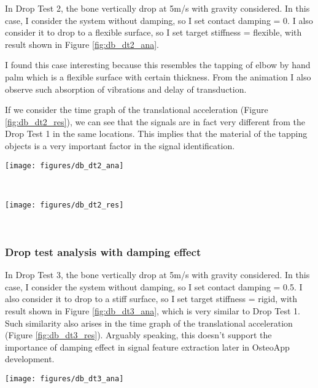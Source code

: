 \documentclass{sigchi}
\begin{document}
In Drop Test 2, the bone vertically drop at 5m/s with gravity considered. In this case, I consider the system without damping, so I set contact damping = 0. I also consider it to drop to a flexible surface, so I set target stiffness = flexible, with result shown in Figure \ref{fig:db_dt2_ana}. 

I found this case interesting because this resembles the tapping of elbow by hand palm which is a flexible surface with certain thickness. From the animation I also observe such absorption of vibrations and delay of transduction.

If we consider the time graph of the translational acceleration (Figure \ref{fig:db_dt2_res}), we can see that the signals are in fact very different from the Drop Test 1 in the same locations. This implies that the material of the tapping objects is a very important factor in the signal identification.

\begin{figure*}
  \centering
  \texttt{[image: figures/db\_dt2\_ana]}
  \caption{analysis for Drop Test 2 for double bone in (a) stress, (b) displacement and (c) strain.}
    ~\label{fig:db_dt2_ana}
\end{figure*}

\begin{figure*}
  \centering
  \texttt{[image: figures/db\_dt2\_res]}
  \caption{response graphs for Drop Test 2 for double bone in three different location (nodes).}
    ~\label{fig:db_dt2_res}
\end{figure*}


\subsubsection{Drop test analysis with damping effect}

In Drop Test 3, the bone vertically drop at 5m/s with gravity considered. In this case, I consider the system without damping, so I set contact damping = 0.5. I also consider it to drop to a stiff surface, so I set target stiffness = rigid, with result shown in Figure \ref{fig:db_dt3_ana}, which is very similar to Drop Test 1. Such similarity also arises in the time graph of the translational acceleration (Figure \ref{fig:db_dt3_res}). Arguably speaking, this doesn't support the importance of damping effect in signal feature extraction later in OsteoApp development. 

\begin{figure*}
  \centering
  \texttt{[image: figures/db\_dt3\_ana]}
  \caption{analysis for Drop Test 3 for double bone in (a) stress, (b) displacement and (c) strain.}
    ~\label{fig:db_dt3_ana}
\end{figure*}
\end{document}
